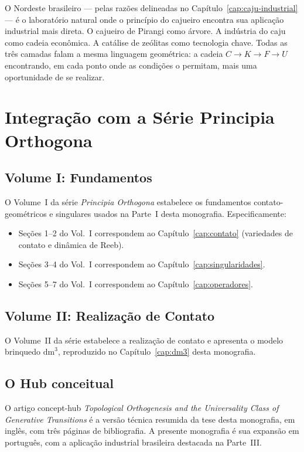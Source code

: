 \documentclass[12pt,a4paper,twoside]{book}
\theoremstyle{plain}
\theoremstyle{definition}
\theoremstyle{definition}
\newcommand{\dm}{\mathrm{dm}^{3}}
\begin{document}
O Nordeste brasileiro --- pelas razões delineadas no
Capítulo~\ref{cap:caju-industrial} --- é o laboratório natural onde o
princípio do cajueiro encontra sua aplicação industrial mais direta.
O cajueiro de Pirangi como árvore. A indústria do caju como cadeia
econômica. A catálise de zeólitas como tecnologia chave. Todas as três
camadas falam a mesma linguagem geométrica: a cadeia
$C \to K \to F \to U$ encontrando, em cada ponto onde as condições
o permitam, mais uma oportunidade de se realizar.

\chapter{Integração com a Série Principia Orthogona}
\label{cap:integracao}

\section{Volume I: Fundamentos}

O Volume~I da série \emph{Principia Orthogona} \cite{Grossi2026I} estabelece os fundamentos contato-geométricos
e singulares usados na Parte~I desta monografia. Especificamente:
\begin{itemize}
  \item Seções 1--2 do Vol.~I correspondem ao Capítulo~\ref{cap:contato}
        (variedades de contato e dinâmica de Reeb).
  \item Seções 3--4 do Vol.~I correspondem ao Capítulo~\ref{cap:singularidades}.
  \item Seções 5--7 do Vol.~I correspondem ao Capítulo~\ref{cap:operadores}.
\end{itemize}

\section{Volume II: Realização de Contato}

O Volume~II da série \cite{Grossi2026II} estabelece a
realização de contato e apresenta o modelo brinquedo $\dm$, reproduzido
no Capítulo~\ref{cap:dm3} desta monografia.

\section{O Hub conceitual}

O artigo concept-hub \cite{GrossiOrtho} \emph{Topological Orthogenesis and the
Universality Class of Generative Transitions}
é a versão técnica resumida da tese desta monografia, em inglês, com
três páginas de bibliografia. A presente monografia é sua expansão em
português, com a aplicação industrial brasileira destacada na Parte~III.
\end{document}
